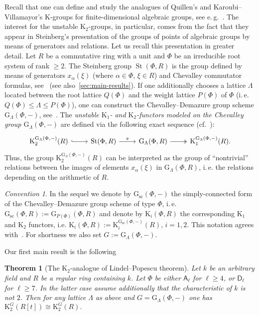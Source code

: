 \documentclass[oneside, 11pt]{amsart}
\numberwithin{equation}{section}
\newtheorem{theorem}[lemma]{Theorem}
\newcommand{\K}{{\mathrm{K}}}
\newcommand{\St}{\mathop{\mathrm{St}}\nolimits}
\newcommand{\Gsc}{\mathrm{G}_\mathrm{sc}}
\theoremstyle{definition}
\theoremstyle{definition}
\theoremstyle{remark}
\newtheorem*{conv}{Convention}
\newcommand{\rA}{\mathsf{A}}
\newcommand{\rD}{\mathsf{D}}
\begin{document}
Recall that one can define and study the analogues of Quillen's and Karoubi--Villamayor's $\K$-groups for finite-dimensional algebraic groups, see e.\,g.~\cite{Abe83, Jar83, Pa89, Re75, Sta14, Sta20, St71, St78, Su82, Tu83, VW16}. The interest for the unstable $\K_2$-groups, in particular, comes from the fact that they appear in Steinberg's presentation of the groups of points of algebraic groups by means of generators and relations. Let us recall this presentation in greater detail. Let $R$ be a commutative ring with a unit and $\Phi$ be an irreducible root system of rank $\geq 2$. The Steinberg group $\St(\Phi, R)$ is the group defined by means of generators $x_\alpha(\xi)$ (where $\alpha\in\Phi$, $\xi\in R$) and Chevalley commutator formulas, see~\cite[Ch.~6]{St67} (see also~\cref{sec:main-results}).
If one additionally chooses a lattice $\Lambda$ located between the root lattice $Q(\Phi)$ and the weight lattice $P(\Phi)$ of $\Phi$ (i.\,e. $Q(\Phi) \leq \Lambda \leq P(\Phi)$), one can construct the Chevalley--Demazure group scheme $\mathrm{G}_\Lambda(\Phi, -)$, see~\cite[\S~3]{St67}. The {\it unstable $\K_1$- and $\K_2$-functors modeled on the Chevalley group $ \mathrm{G}_\Lambda(\Phi, -)$} are defined via the following exact sequence (cf.~\cite{St78}):
\begin{equation} \label{eq:main-exactSeq} \begin{tikzcd} \K_2^{\mathrm{G}_\Lambda(\Phi, -)}(R) \ar[hookrightarrow]{r} & \St(\Phi, R) \ar{r}{\pi} & \mathrm{G}_\Lambda(\Phi, R) \ar[twoheadrightarrow]{r} & \K_1^{\mathrm{G}_\Lambda(\Phi, -)}(R). \end{tikzcd} \end{equation}
Thus, the group $\K_2^{\mathrm{G}_\Lambda(\Phi, -)}(R)$ can be interpreted as the group of ``nontrivial'' relations between the images of elements $x_\alpha(\xi)$ in $\mathrm{G}_\Lambda(\Phi, R)$, i.\,e. the relations depending on the arithmetic of $R$.
\begin{conv}
In the sequel we denote by $\Gsc(\Phi,-)$ the simply-connected form of the Chevalley--Demazure group scheme of type $\Phi$, i.\,e. $\mathrm{G}_\mathrm{sc}(\Phi, R) := \mathrm{G}_{P(\Phi)}(\Phi, R)$ and denote by $\K_i(\Phi, R)$ the corresponding $\K_1$ and $\K_2$ functors, i.e. $\K_i(\Phi, R) := \K_i^{\mathrm{G}_\mathrm{sc}(\Phi, -)}(R)$, $i=1,2$. This notation agrees with~\cite{St78}.
For shortness we also set $G := \mathrm{G}_\Lambda(\Phi, -)$.
\end{conv}
Our first main result is the following

\begin{theorem}[The $\K_2$-analogue of Lindel--Popescu theorem] \label{theorem:LP-for-K2}
Let $k$ be an arbitrary field and $R$ be a regular ring containing $k$. Let $\Phi$ be either $\rA_\ell$ for $\ell\geq4$, or $\rD_\ell$ for $\ell\geq 7$. In the latter case assume additionally that the characteristic of $k$ is not $2$. Then for any lattice $\Lambda$ as above and $G = \mathrm{G}_\Lambda(\Phi, -)$ one has $\K_2^G(R[t])\cong\K_2^G(R).$
\end{theorem} 
\end{document}
